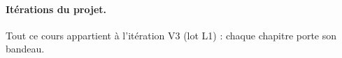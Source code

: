 \documentclass[11pt,a4paper]{report}
\begin{document}
\paragraph{Itérations du projet.} Tout ce cours appartient à l'itération V3 (lot L1) : chaque chapitre porte son bandeau.
\legendeiterations

\tableofcontents
\cleardoublepage
{}










\appendix

\end{document}
